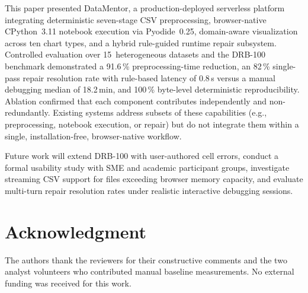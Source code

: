 \documentclass[conference]{IEEEtran}
\begin{document}
This paper presented DataMentor, a production-deployed serverless
platform integrating deterministic seven-stage CSV preprocessing,
browser-native CPython~3.11 notebook execution via Pyodide~0.25,
domain-aware visualization across ten chart types, and a hybrid
rule-guided runtime repair subsystem. Controlled evaluation over
15~heterogeneous datasets and the DRB-100 benchmark demonstrated a
91.6\,\% preprocessing-time reduction, an 82\,\% single-pass repair
resolution rate with rule-based latency of 0.8\,s versus a manual
debugging median of 18.2\,min, and 100\,\% byte-level deterministic
reproducibility. Ablation confirmed that each component contributes
independently and non-redundantly. Existing systems address subsets of
these capabilities (e.g., preprocessing, notebook execution, or repair)
but do not integrate them within a single, installation-free,
browser-native workflow.

Future work will extend DRB-100 with user-authored cell errors, conduct
a formal usability study with SME and academic participant groups,
investigate streaming CSV support for files exceeding browser memory
capacity, and evaluate multi-turn repair resolution rates under realistic
interactive debugging sessions.

\section*{Acknowledgment}

The authors thank the reviewers for their constructive comments and
the two analyst volunteers who contributed manual baseline measurements.
No external funding was received for this work.
\end{document}
